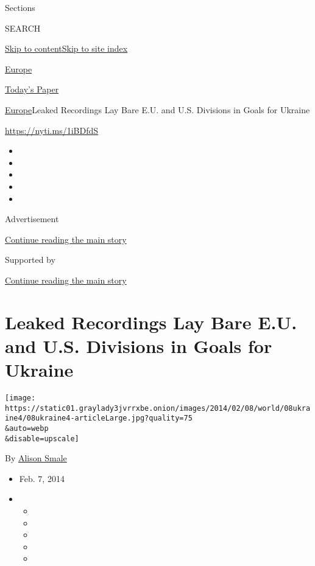 Sections

SEARCH

\protect\hyperlink{site-content}{Skip to
content}\protect\hyperlink{site-index}{Skip to site index}

\href{https://www.nytimes3xbfgragh.onion/section/world/europe}{Europe}

\href{https://myaccount.nytimes3xbfgragh.onion/auth/login?response_type=cookie\&client_id=vi}{}

\href{https://www.nytimes3xbfgragh.onion/section/todayspaper}{Today's
Paper}

\href{/section/world/europe}{Europe}\textbar{}Leaked Recordings Lay Bare
E.U. and U.S. Divisions in Goals for Ukraine

\url{https://nyti.ms/1iBDfdS}

\begin{itemize}
\item
\item
\item
\item
\item
\end{itemize}

Advertisement

\protect\hyperlink{after-top}{Continue reading the main story}

Supported by

\protect\hyperlink{after-sponsor}{Continue reading the main story}

\hypertarget{leaked-recordings-lay-bare-eu-and-us-divisions-in-goals-for-ukraine}{%
\section{Leaked Recordings Lay Bare E.U. and U.S. Divisions in Goals for
Ukraine}\label{leaked-recordings-lay-bare-eu-and-us-divisions-in-goals-for-ukraine}}

\texttt{[image: https://static01.graylady3jvrrxbe.onion/images/2014/02/08/world/08ukraine4/08ukraine4-articleLarge.jpg?quality=75\\\&auto=webp\\\&disable=upscale]}

By \href{http://www.nytimes3xbfgragh.onion/by/alison-smale}{Alison
Smale}

\begin{itemize}
\item
  Feb. 7, 2014
\item
  \begin{itemize}
  \item
  \item
  \item
  \item
  \item
  \end{itemize}
\end{itemize}


